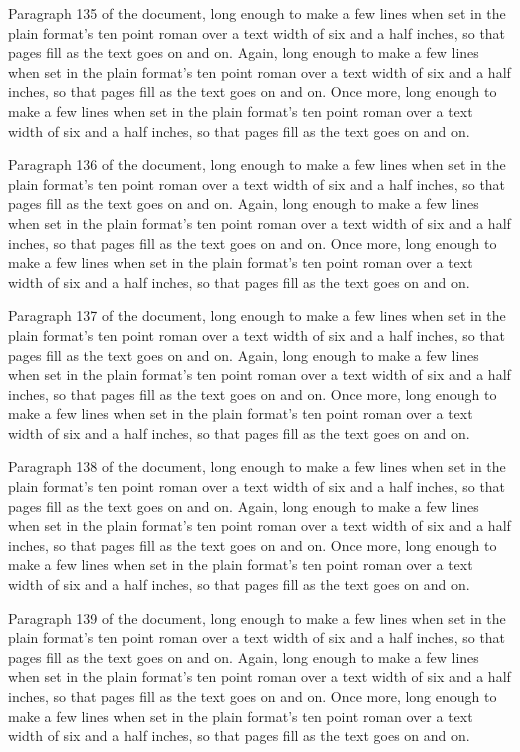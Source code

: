 Paragraph 135 of the document, long enough to make a few lines when set in the plain format's ten point roman over a text width of six and a half inches, so that pages fill as the text goes on and on. Again, long enough to make a few lines when set in the plain format's ten point roman over a text width of six and a half inches, so that pages fill as the text goes on and on. Once more, long enough to make a few lines when set in the plain format's ten point roman over a text width of six and a half inches, so that pages fill as the text goes on and on.

Paragraph 136 of the document, long enough to make a few lines when set in the plain format's ten point roman over a text width of six and a half inches, so that pages fill as the text goes on and on. Again, long enough to make a few lines when set in the plain format's ten point roman over a text width of six and a half inches, so that pages fill as the text goes on and on. Once more, long enough to make a few lines when set in the plain format's ten point roman over a text width of six and a half inches, so that pages fill as the text goes on and on.

Paragraph 137 of the document, long enough to make a few lines when set in the plain format's ten point roman over a text width of six and a half inches, so that pages fill as the text goes on and on. Again, long enough to make a few lines when set in the plain format's ten point roman over a text width of six and a half inches, so that pages fill as the text goes on and on. Once more, long enough to make a few lines when set in the plain format's ten point roman over a text width of six and a half inches, so that pages fill as the text goes on and on.

Paragraph 138 of the document, long enough to make a few lines when set in the plain format's ten point roman over a text width of six and a half inches, so that pages fill as the text goes on and on. Again, long enough to make a few lines when set in the plain format's ten point roman over a text width of six and a half inches, so that pages fill as the text goes on and on. Once more, long enough to make a few lines when set in the plain format's ten point roman over a text width of six and a half inches, so that pages fill as the text goes on and on.

Paragraph 139 of the document, long enough to make a few lines when set in the plain format's ten point roman over a text width of six and a half inches, so that pages fill as the text goes on and on. Again, long enough to make a few lines when set in the plain format's ten point roman over a text width of six and a half inches, so that pages fill as the text goes on and on. Once more, long enough to make a few lines when set in the plain format's ten point roman over a text width of six and a half inches, so that pages fill as the text goes on and on.

